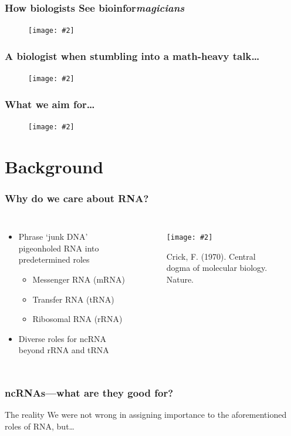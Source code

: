\documentclass{beamer}
\newcommand{\slidefigure}[2][1]{\texttt{[image: \#2]}}
\begin{document}
\begin{frame}
	\frametitle{How biologists See bioinfor{\em magicians}}
	\begin{figure}
		\centering \slidefigure{nemo}
	\end{figure}
\end{frame}

\begin{frame}
	\frametitle{A biologist when stumbling into a math-heavy talk\dots}
	\begin{figure}
		\centering \slidefigure{nemofocus}
	\end{figure}
\end{frame}

\begin{frame}
	\frametitle{What we aim for\dots}
	\begin{figure}
		\centering \slidefigure{nemoturtle}
	\end{figure}
\end{frame}

\section{Background}

\begin{frame}
	\frametitle{Why do we care about RNA?}
	\begin{columns}
		\begin{itemize}
			\item<1-> Phrase `junk DNA' pigeonholed RNA into predetermined roles
			\begin{itemize}
				\item<2-> Messenger RNA (mRNA)
				\item<2-> Transfer RNA (tRNA)
				\item<2-> Ribosomal RNA (rRNA)
			\end{itemize}
			\item<3-> Diverse roles for ncRNA beyond rRNA and tRNA
		\end{itemize}

		\begin{figure}
			\centering \slidefigure{crick1970} \caption{Crick, F. (1970). Central dogma of molecular biology. Nature.}
		\end{figure}
	\end{columns}
\end{frame}

\begin{frame}
	\frametitle{ncRNAs---what are they good for?}
	\begin{block}
		{The reality} We were not wrong in assigning importance to the aforementioned roles of RNA, but\dots
	\end{block}
\end{frame}
\end{document}
